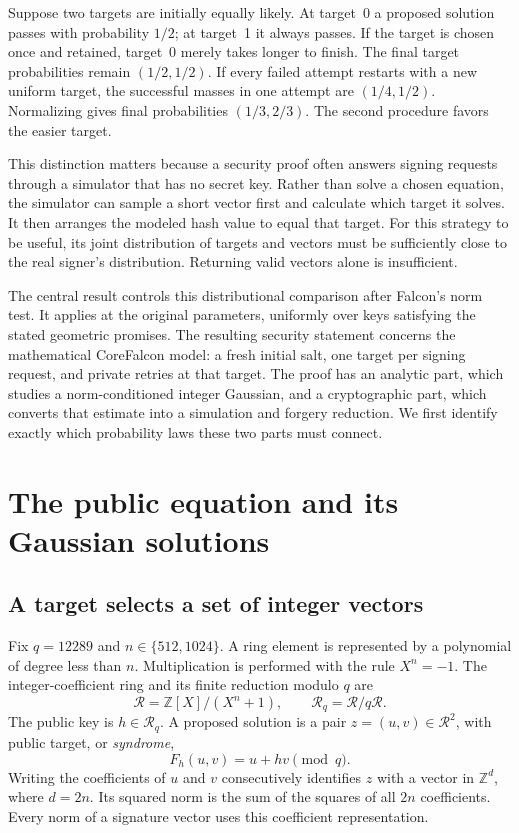 \documentclass[11pt,a4paper]{article}
\newcommand{\Z}{\mathbb Z}
\theoremstyle{definition}
\theoremstyle{remark}
\numberwithin{equation}{section}
\begin{document}
Suppose two targets are initially equally likely. At target~0 a proposed
solution passes with probability $1/2$; at target~1 it always passes. If the
target is chosen once and retained, target~0 merely takes longer to finish.
The final target probabilities remain $(1/2,1/2)$. If every failed attempt
restarts with a new uniform target, the successful masses in one attempt are
$(1/4,1/2)$. Normalizing gives final probabilities $(1/3,2/3)$. The second
procedure favors the easier target.

This distinction matters because a security proof often answers signing
requests through a simulator that has no secret key. Rather than solve a
chosen equation, the simulator can sample a short vector first and calculate
which target it solves. It then arranges the modeled hash value to equal that
target. For this strategy to be useful, its joint distribution of targets and
vectors must be sufficiently close to the real signer's distribution. Returning
valid vectors alone is insufficient.

The central result controls this distributional comparison after Falcon's norm
test. It applies at the original parameters, uniformly over keys satisfying
the stated geometric promises. The resulting security statement concerns the
mathematical CoreFalcon model: a fresh initial salt, one target per signing
request, and private retries at that target. The proof has an analytic part,
which studies a norm-conditioned integer Gaussian, and a cryptographic part,
which converts that estimate into a simulation and forgery reduction. We first
identify exactly which probability laws these two parts must connect.

\section{The public equation and its Gaussian solutions}
\label{sec:equation-gaussian}

\subsection{A target selects a set of integer vectors}

Fix $q=12289$ and $n\in\{512,1024\}$. A ring element is represented by a
polynomial of degree less than $n$. Multiplication is performed with the rule
$X^n=-1$. The integer-coefficient ring and its finite reduction modulo $q$ are
\[
 \mathcal R=\Z[X]/(X^n+1),
 \qquad \mathcal R_q=\mathcal R/q\mathcal R.
\]
The public key is $h\in\mathcal R_q$. A proposed solution is a pair
$z=(u,v)\in\mathcal R^2$, with public target, or \emph{syndrome},
\[
 F_h(u,v)=u+hv\pmod q.
\]
Writing the coefficients of $u$ and $v$ consecutively identifies $z$ with a
vector in $\Z^d$, where $d=2n$. Its squared norm is the sum of the squares of
all $2n$ coefficients. Every norm of a signature vector uses this coefficient
representation.
\end{document}
